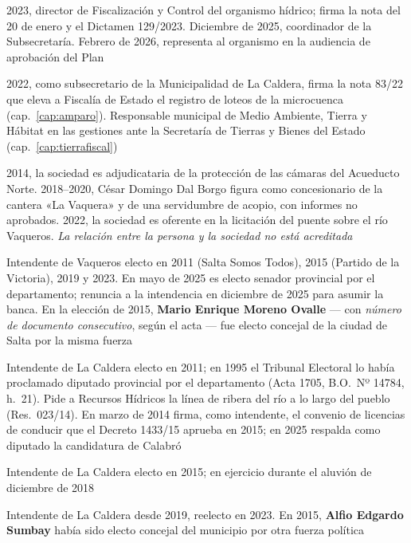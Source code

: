 \begin{personas}
\item[{\textbf{David Le Favi}}] 2023, director de Fiscalización y Control del organismo hídrico; firma la nota del 20 de enero y el Dictamen 129/2023. Diciembre de 2025, coordinador de la Subsecretaría. Febrero de 2026, representa al organismo en la audiencia de aprobación del Plan

\item[{\textbf{Rodrigo Matías Páez}}] 2022, como subsecretario de la Municipalidad de La Caldera, firma la nota 83/22 que eleva a Fiscalía de Estado el registro de loteos de la microcuenca (cap.\ \ref{cap:amparo}). Responsable municipal de Medio Ambiente, Tierra y Hábitat en las gestiones ante la Secretaría de Tierras y Bienes del Estado (cap.\ \ref{cap:tierrafiscal})

\item[{\textbf{Dal Borgo} (César Domingo; Dal Borgo Construcciones S.R.L.)}] 2014, la sociedad es adjudicataria de la protección de las cámaras del Acueducto Norte. 2018--2020, César Domingo Dal Borgo figura como concesionario de la cantera «La Vaquera» y de una servidumbre de acopio, con informes no aprobados. 2022, la sociedad es oferente en la licitación del puente sobre el río Vaqueros. \textit{La relación entre la persona y la sociedad no está acreditada}

\item[{\textbf{Daniel Roberto Moreno Ovalle\index{Moreno Ovalle, Daniel Roberto}}}] Intendente de Vaqueros electo en 2011 (Salta Somos Todos), 2015 (Partido de la Victoria), 2019 y 2023. En mayo de 2025 es electo senador provincial por el departamento; renuncia a la intendencia en diciembre de 2025 para asumir la banca. En la elección de 2015, \textbf{Mario Enrique Moreno Ovalle} --- con \textit{número de documento consecutivo}, según el acta --- fue electo concejal de la ciudad de Salta por la misma fuerza

\item[{\textbf{Luis Gerardo Mendaña\index{Mendaña, Luis Gerardo}}}] Intendente de La Caldera electo en 2011; en 1995 el Tribunal Electoral lo había proclamado diputado provincial por el departamento (Acta 1705, B.O.\ Nº 14784, h.\ 21). Pide a Recursos Hídricos la línea de ribera del río a lo largo del pueblo (Res.\ 023/14). En marzo de 2014 firma, como intendente, el convenio de licencias de conducir que el Decreto 1433/15 aprueba en 2015; en 2025 respalda como diputado la candidatura de Calabró

\item[{\textbf{Daniel Alejandro Escalera\index{Escalera, Daniel Alejandro}}}] Intendente de La Caldera electo en 2015; en ejercicio durante el aluvión de diciembre de 2018

\item[{\textbf{Diego Ramiro Sumbay\index{Sumbay, Diego Ramiro}}}] Intendente de La Caldera desde 2019, reelecto en 2023. En 2015, \textbf{Alfio Edgardo Sumbay} había sido electo concejal del municipio por otra fuerza política

\end{personas}

